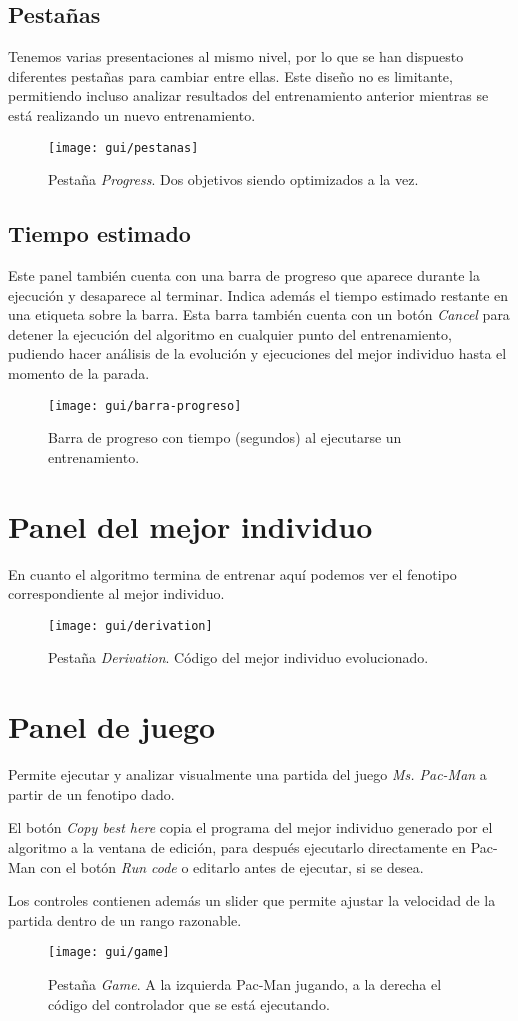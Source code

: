 \subsection{Pestañas}
Tenemos varias presentaciones al mismo nivel, por lo que se han dispuesto diferentes pestañas para cambiar entre ellas. Este diseño no es limitante, permitiendo incluso analizar resultados del entrenamiento anterior mientras se está realizando un nuevo entrenamiento.
\begin{figure}[H]
\centering
\texttt{[image: gui/pestanas]}
\caption{Pestaña \textit{Progress}. Dos objetivos siendo optimizados a la vez.}
\end{figure}

\subsection{Tiempo estimado}
Este panel también cuenta con una barra de progreso que aparece durante la ejecución y desaparece al terminar. Indica además el tiempo estimado restante en una etiqueta sobre la barra. Esta barra también cuenta con un botón \textit{Cancel} para detener la ejecución del algoritmo en cualquier punto del entrenamiento, pudiendo hacer análisis de la evolución y ejecuciones del mejor individuo hasta el momento de la parada.
\begin{figure}[H]
\centering
\texttt{[image: gui/barra-progreso]}
\caption{Barra de progreso con tiempo (segundos) al ejecutarse un entrenamiento.}
\end{figure}

\section{Panel del mejor individuo}
En cuanto el algoritmo termina de entrenar aquí podemos ver el fenotipo correspondiente al mejor individuo.
\begin{figure}[H]
\centering
\texttt{[image: gui/derivation]}
\caption{Pestaña \textit{Derivation}. Código del mejor individuo evolucionado.}
\end{figure}

\section{Panel de juego}
Permite ejecutar y analizar visualmente una partida del juego \textit{Ms. Pac-Man} a partir de un fenotipo dado.

El botón \textit{Copy best here} copia el programa del mejor individuo generado por el algoritmo a la ventana de edición, para después ejecutarlo directamente en Pac-Man con el botón \textit{Run code} o editarlo antes de ejecutar, si se desea.

Los controles contienen además un slider que permite ajustar la velocidad de la partida dentro de un rango razonable.
\begin{figure}[H]
\centering
\texttt{[image: gui/game]}
\caption{Pestaña \textit{Game}. A la izquierda Pac-Man jugando, a la derecha el código del controlador que se está ejecutando.}
\end{figure}
